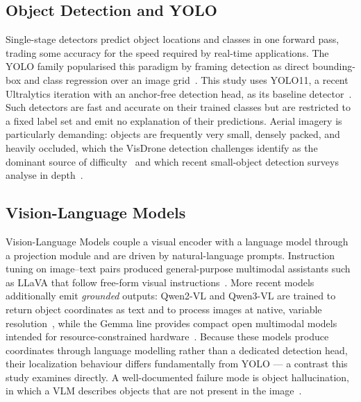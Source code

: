 \documentclass[acmtog, authorversion]{acmart}
\begin{document}
\subsection{Object Detection and YOLO}
Single-stage detectors predict object locations and classes in one
forward pass, trading some accuracy for the speed required by
real-time applications. The YOLO family popularised this paradigm by
framing detection as direct bounding-box and class regression over an
image grid~\cite{redmon2016yolo}. This study uses YOLO11, a recent
Ultralytics iteration with an anchor-free detection head, as its
baseline detector~\cite{jocher2024yolo11}. Such detectors are fast and
accurate on their trained classes but are restricted to a fixed label
set and emit no explanation of their predictions. Aerial imagery is
particularly demanding: objects are frequently very small, densely
packed, and heavily occluded, which the VisDrone detection
challenges identify as the dominant source of
difficulty~\cite{cao2021visdrone} and which recent small-object
detection surveys analyse in depth~\cite{nikouei2025sod}.

\subsection{Vision-Language Models}
Vision-Language Models couple a visual encoder with a language model
through a projection module and are driven by natural-language
prompts. Instruction tuning on image--text pairs produced
general-purpose multimodal assistants such as LLaVA that follow
free-form visual instructions~\cite{liu2023llava}. More recent models
additionally emit \emph{grounded} outputs: Qwen2-VL and Qwen3-VL are
trained to return object coordinates as text and to process images at
native, variable resolution~\cite{wang2024qwen2vl, bai2025qwen3vl},
while the Gemma line provides compact open multimodal models intended
for resource-constrained hardware~\cite{gemmateam2025gemma3,
google2026gemma4}. Because these models produce coordinates through
language modelling rather than a dedicated detection head, their
localization behaviour differs fundamentally from YOLO --- a contrast
this study examines directly. A well-documented failure mode is object
hallucination, in which a VLM describes objects that are not present
in the image~\cite{li2023pope}.
\end{document}
